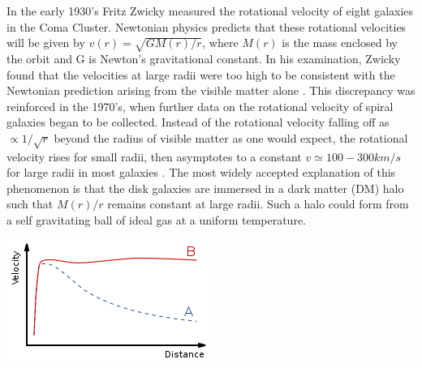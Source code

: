 \documentclass[a4paper,12pt]{article}
\begin{document}
In the early 1930's Fritz Zwicky measured the rotational velocity of eight galaxies in the Coma Cluster.  Newtonian physics predicts that these rotational velocities will be given by $v(r)=\sqrt{GM(r)/r}$, where $M(r)$ is the mass enclosed by the orbit and G is Newton's gravitational constant.  In his examination, Zwicky found that the velocities at large radii were too high to be consistent with the Newtonian prediction arising from the visible matter alone \cite{Zwicky}. This discrepancy was reinforced in the 1970's, when further data on the rotational velocity of spiral galaxies began to be collected.  Instead of the rotational velocity falling off as $\propto 1/\sqrt{r}$ beyond the radius of visible matter as one would expect, the rotational velocity rises for small radii, then asymptotes to a constant $ v \simeq 100-300 km/s $ for large radii in most galaxies \cite{Persic,Battaner,Binney}.  The most widely accepted explanation of this phenomenon is that the disk galaxies are immersed in a dark matter (DM) halo such that $ M(r)/r $ remains constant at large radii.  Such a halo could form from a self gravitating ball of ideal gas at a uniform temperature.

\begin{center}
\includegraphics[scale=1]{RotationCurve.png}
\end{center}
\end{document}
